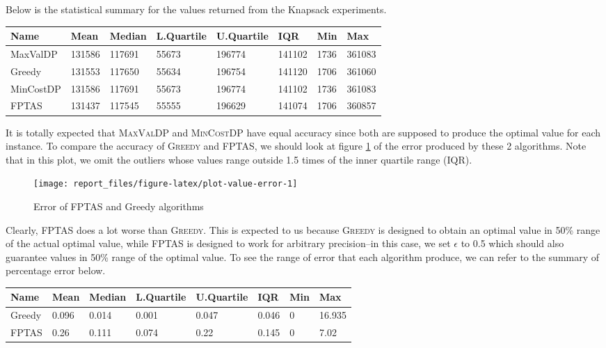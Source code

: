 \documentclass[12pt, oneside]{book}
\begin{document}
Below is the statistical summary for the values returned from the
Knapsack experiments.

\begin{longtable}[]{@{}llllllll@{}}
\toprule
Name & Mean & Median & L.Quartile & U.Quartile & IQR & Min &
Max\tabularnewline
\midrule
\endhead
MaxValDP & 131586 & 117691 & 55673 & 196774 & 141102 & 1736 &
361083\tabularnewline
Greedy & 131553 & 117650 & 55634 & 196754 & 141120 & 1706 &
361060\tabularnewline
MinCostDP & 131586 & 117691 & 55673 & 196774 & 141102 & 1736 &
361083\tabularnewline
FPTAS & 131437 & 117545 & 55555 & 196629 & 141074 & 1706 &
360857\tabularnewline
\bottomrule
\end{longtable}

It is totally expected that \textsc{MaxValDP} and \textsc{MinCostDP}
have equal accuracy since both are supposed to produce the optimal value
for each instance. To compare the accuracy of \textsc{Greedy} and
\textsc{FPTAS}, we should look at figure \ref{fig:plot-value-error} of
the error produced by these 2 algorithms. Note that in this plot, we
omit the outliers whose values range outside 1.5 times of the inner
quartile range (IQR).

\begin{figure}

{\centering \texttt{[image: report\_files/figure-latex/plot-value-error-1]} 

}

\caption{Error of FPTAS and Greedy algorithms}\label{fig:plot-value-error}
\end{figure}

Clearly, \textsc{FPTAS} does a lot worse than \textsc{Greedy}. This is
expected to us because \textsc{Greedy} is designed to obtain an optimal
value in 50\% range of the actual optimal value, while \textsc{FPTAS} is
designed to work for arbitrary precision--in this case, we set
\(\epsilon\) to 0.5 which should also guarantee values in 50\% range of
the optimal value. To see the range of error that each algorithm
produce, we can refer to the summary of percentage error below.

\begin{longtable}[]{@{}llllllll@{}}
\toprule
Name & Mean & Median & L.Quartile & U.Quartile & IQR & Min &
Max\tabularnewline
\midrule
\endhead
Greedy & 0.096 & 0.014 & 0.001 & 0.047 & 0.046 & 0 &
16.935\tabularnewline
FPTAS & 0.26 & 0.111 & 0.074 & 0.22 & 0.145 & 0 & 7.02\tabularnewline
\bottomrule
\end{longtable}
\end{document}
